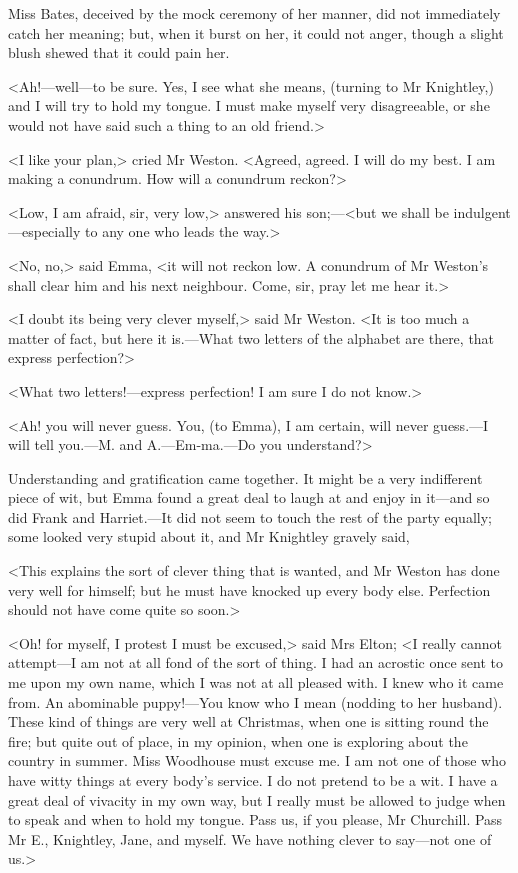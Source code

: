Miss Bates, deceived by the mock ceremony of her manner, did not immediately catch her meaning; but, when it burst on her, it could not anger, though a slight blush shewed that it could pain her.

<Ah!—well—to be sure. Yes, I see what she means, (turning to Mr Knightley,) and I will try to hold my tongue. I must make myself very disagreeable, or she would not have said such a thing to an old friend.>

<I like your plan,> cried Mr Weston. <Agreed, agreed. I will do my best. I am making a conundrum. How will a conundrum reckon?>

<Low, I am afraid, sir, very low,> answered his son;—<but we shall be indulgent—especially to any one who leads the way.>

<No, no,> said Emma, <it will not reckon low. A conundrum of Mr Weston's shall clear him and his next neighbour. Come, sir, pray let me hear it.>

<I doubt its being very clever myself,> said Mr Weston. <It is too much a matter of fact, but here it is.—What two letters of the alphabet are there, that express perfection?>

<What two letters!—express perfection! I am sure I do not know.>

<Ah! you will never guess. You, (to Emma), I am certain, will never guess.—I will tell you.—M. and A.—Em-ma.—Do you understand?>

Understanding and gratification came together. It might be a very indifferent piece of wit, but Emma found a great deal to laugh at and enjoy in it—and so did Frank and Harriet.—It did not seem to touch the rest of the party equally; some looked very stupid about it, and Mr Knightley gravely said,

<This explains the sort of clever thing that is wanted, and Mr Weston has done very well for himself; but he must have knocked up every body else. Perfection should not have come quite so soon.>

<Oh! for myself, I protest I must be excused,> said Mrs Elton; <I really cannot attempt—I am not at all fond of the sort of thing. I had an acrostic once sent to me upon my own name, which I was not at all pleased with. I knew who it came from. An abominable puppy!—You know who I mean (nodding to her husband). These kind of things are very well at Christmas, when one is sitting round the fire; but quite out of place, in my opinion, when one is exploring about the country in summer. Miss Woodhouse must excuse me. I am not one of those who have witty things at every body's service. I do not pretend to be a wit. I have a great deal of vivacity in my own way, but I really must be allowed to judge when to speak and when to hold my tongue. Pass us, if you please, Mr Churchill. Pass Mr E., Knightley, Jane, and myself. We have nothing clever to say—not one of us.>

